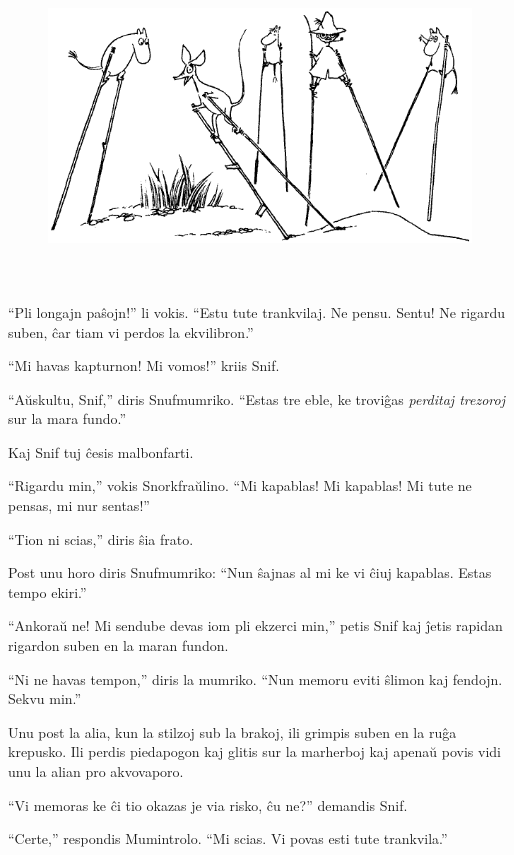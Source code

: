 \begin{figure}[htbp]
\centering
\includegraphics[width=430pt,height=238pt]{7-3.png}
\caption{}
\label{7-3}
\end{figure}

``Pli longajn paŝojn!'' li vokis. ``Estu tute trankvilaj. Ne pensu. Sentu! Ne rigardu suben, ĉar tiam vi perdos la ekvilibron.''

``Mi havas kapturnon! Mi vomos!'' kriis Snif.

``Aŭskultu, Snif,'' diris Snufmumriko. ``Estas tre eble, ke troviĝas \emph{perditaj trezoroj} sur la mara fundo.''

Kaj Snif tuj ĉesis malbonfarti.

``Rigardu min,'' vokis Snorkfraŭlino. ``Mi kapablas! Mi kapablas! Mi tute ne pensas, mi nur sentas!''

``Tion ni scias,'' diris ŝia frato.

Post unu horo diris Snufmumriko: ``Nun ŝajnas al mi ke vi ĉiuj kapablas. Estas tempo ekiri.''

``Ankoraŭ ne! Mi sendube devas iom pli ekzerci min,'' petis Snif kaj ĵetis rapidan rigardon suben en la maran fundon.

``Ni ne havas tempon,'' diris la mumriko. ``Nun memoru eviti ŝlimon kaj fendojn. Sekvu min.''

Unu post la alia, kun la stilzoj sub la brakoj, ili grimpis suben en la ruĝa krepusko. Ili perdis piedapogon kaj glitis sur la marherboj kaj apenaŭ povis vidi unu la alian pro akvovaporo.

``Vi memoras ke ĉi tio okazas je via risko, ĉu ne?'' demandis Snif.

``Certe,'' respondis Mumintrolo. ``Mi scias. Vi povas esti tute trankvila.''

